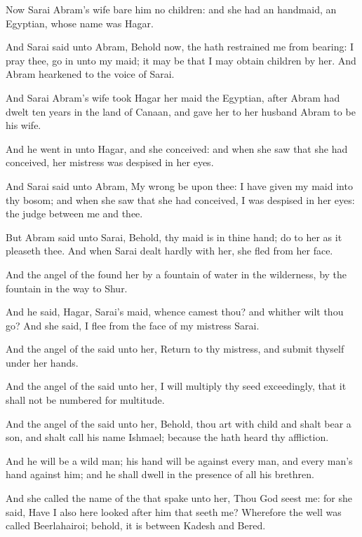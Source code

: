 \Chapter
\Verse Now Sarai Abram's wife bare him no children: and she had an handmaid, an Egyptian, whose name was Hagar.

\Verse And Sarai said unto Abram, Behold now, the \LORD hath restrained me from bearing: I pray thee, go in unto my maid; it may be that I may obtain children by her. And Abram hearkened to the voice of Sarai.

\Verse And Sarai Abram's wife took Hagar her maid the Egyptian, after Abram had dwelt ten years in the land of Canaan, and gave her to her husband Abram to be his wife.

\Verse And he went in unto Hagar, and she conceived: and when she saw that she had conceived, her mistress was despised in her eyes.

\Verse And Sarai said unto Abram, My wrong be upon thee: I have given my maid into thy bosom; and when she saw that she had conceived, I was despised in her eyes: the \LORD judge between me and thee.

\Verse But Abram said unto Sarai, Behold, thy maid is in thine hand; do to her as it pleaseth thee. And when Sarai dealt hardly with her, she fled from her face.

\Verse And the angel of the \LORD found her by a fountain of water in the wilderness, by the fountain in the way to Shur.

\Verse And he said, Hagar, Sarai's maid, whence camest thou? and whither wilt thou go? And she said, I flee from the face of my mistress Sarai.

\Verse And the angel of the \LORD said unto her, Return to thy mistress, and submit thyself under her hands.

\Verse And the angel of the \LORD said unto her, I will multiply thy seed exceedingly, that it shall not be numbered for multitude.

\Verse And the angel of the \LORD said unto her, Behold, thou art with child and shalt bear a son, and shalt call his name Ishmael; because the \LORD hath heard thy affliction.

\Verse And he will be a wild man; his hand will be against every man, and every man's hand against him; and he shall dwell in the presence of all his brethren.

\Verse And she called the name of the \LORD that spake unto her, Thou God seest me: for she said, Have I also here looked after him that seeth me?  \Verse Wherefore the well was called Beerlahairoi; behold, it is between Kadesh and Bered.

